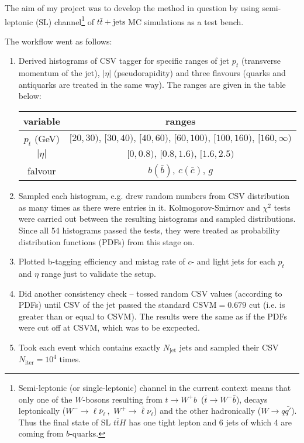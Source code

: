 \documentclass[12pt,a4paper]{article}
\begin{document}
The aim of my project was to develop the method in question by using semi-leptonic (SL) channel\footnote{Semi-leptonic (or single-leptonic) channel in the current context means that only one of the $W$-bosons resulting from $t\to W^+b\,$ ($\bar{t}\to W^-\bar{b}$), decays leptonically ($W^-\to \mathcal{\ell}\bar{\nu}_\mathcal{\ell}\,,\,\,W^+\to \bar{\mathcal{\ell}}\nu_\mathcal{\ell}$) and the other hadronically ($W\to q\bar{q'}$). Thus the final state of SL $t\bar{t}H$ has one tight lepton and 6 jets of which 4 are coming from $b$-quarks.}
of $t\bar{t}+\mbox{jets}$ MC simulations as a test bench.

\noindent The workflow went as follows:
\begin{enumerate}
\item Derived histograms of CSV tagger for specific ranges of jet $p_t$ (transverse momentum of the jet), $|\eta|$ (pseudorapidity) and three flavours (quarks and antiquarks are treated in the same way).
The ranges are given in the table below:
\begin{center}
	\begin{tabular}{ c | c }
		\hline
		variable & ranges \\ \hline
		$p_t$ (GeV) & $[20,30),\,[30,40),\,[40,60),\,[60,100),\,[100,160),\,[160,\infty)$ \\ \hline
		$|\eta|$ & $[0,0.8),\,[0.8,1.6),\,[1.6,2.5)$ \\ \hline
		falvour & $b(\bar{b})$, $c(\bar{c})$, $g$ \\
	\end{tabular}
\end{center}
\item Sampled each histogram, e.g. drew random numbers from CSV distribution as many times as there were entries in it.
Kolmogorov-Smirnov and $\chi^2$ tests were carried out between the resulting histograms and sampled distributions.
Since all 54 histograms passed the tests, they were treated as probability distribution functions (PDFs) from this stage on.
\item Plotted b-tagging efficiency and mistag rate of $c$- and light jets for each $p_t$ and $\eta$ range just to validate the setup.
\item Did another consistency check -- tossed random CSV values (according to PDFs) until CSV of the jet passed the standard $\mbox{CSVM}=0.679$ cut (i.e. is greater than or equal to CSVM).
The results were the same as if the PDFs were cut off at CSVM, which was to be excpected.
\item Took each event which contains exactly $N_{\text{jet}}$ jets and sampled their CSV $N_{\text{iter}} = 10^4$ times.

\end{enumerate}
\end{document}
